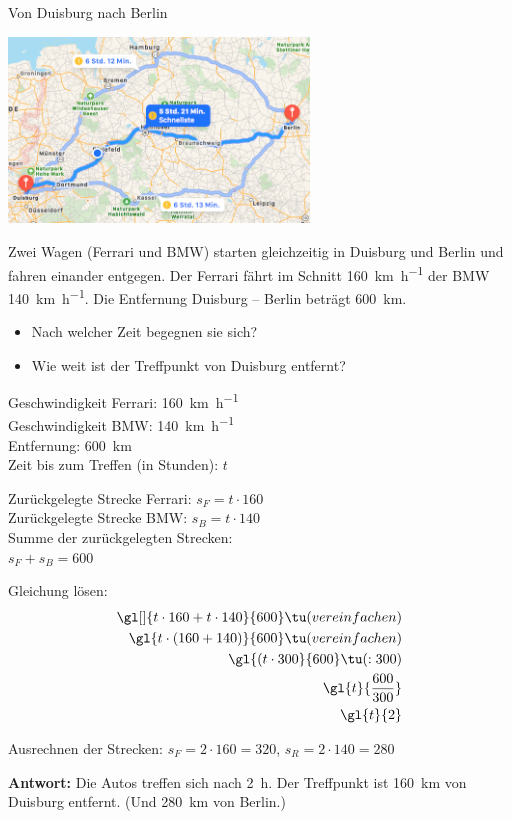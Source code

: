 \documentclass[12pt,a5paper,landscape]{scrartcl}
\begin{document}
\begin{karte3}{Von Duisburg nach Berlin}
\begin{center}
	\includegraphics[width=8cm]{7.4-LT-Abb_Route}
\end{center}
Zwei Wagen (Ferrari und BMW) starten gleichzeitig in Duisburg und Berlin und fahren einander entgegen. Der Ferrari fährt im Schnitt \SI{160}{\kilo\meter\per\hour} der BMW \SI{140}{\kilo\meter\per\hour}. Die Entfernung Duisburg – Berlin beträgt \SI{600}{\kilo\meter}.
\begin{itemize}
	\item Nach welcher Zeit begegnen sie sich?
	\item Wie weit ist der Treffpunkt von Duisburg entfernt?
\end{itemize}
\end{karte3}

\begin{loesungskarte}\small
\begin{multicols}{2}
	Geschwindigkeit Ferrari: \SI{160}{\kilo\meter\per\hour} \\
	Geschwindigkeit BMW: \SI{140}{\kilo\meter\per\hour} \\
	Entfernung: \SI{600}{\kilo\meter} \\
	Zeit bis zum Treffen (in Stunden): $t$
	
	\columnbreak
	
	Zurückgelegte Strecke Ferrari: $s_F = t\cdot 160$ \\
	Zurückgelegte Strecke BMW: $s_B = t\cdot 140$ \\
	Summe der zurückgelegten Strecken: \\ $s_F + s_B = 600$ 
\end{multicols}Gleichung lösen:\vspace{-2.8em}
\begin{alignat*}{3}
	\gl[]{t\cdot 160 + t\cdot 140}{600} \tu(vereinfachen) \\
	\gl{t\cdot (160 + 140)}{600} \tu(vereinfachen) \\
	\gl{(t\cdot 300}{600} \tu(:300) \\
	\gl{t}{\dfrac{600}{300}} \\
	\gl{t}{2}
\end{alignat*}

Ausrechnen der Strecken: $s_F = 2\cdot 160 = 320$, $s_R = 2\cdot 140 = 280$

\textbf{Antwort:} Die Autos treffen sich nach \SI{2}{\hour}. Der Treffpunkt ist \SI{160}{\kilo\meter} von Duisburg entfernt. (Und \SI{280}{\kilo\meter} von Berlin.)
\end{loesungskarte}
\end{document}
